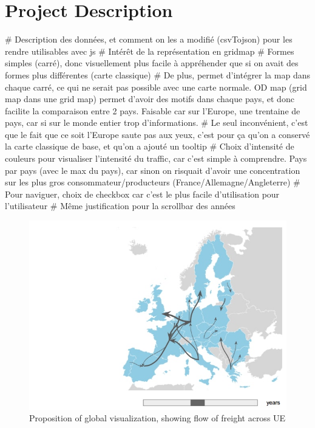 \documentclass{vgtc}
\begin{document}
\section{Project Description}
# Description des données, et comment on les a modifié (csvTojson) pour les rendre utilisables avec js 
# Intérêt de la représentation en gridmap
# Formes simples (carré), donc visuellement plus facile à appréhender que si on avait des formes plus différentes (carte classique)
# De plus, permet d'intégrer la map dans chaque carré, ce qui ne serait pas possible avec une carte normale. OD map (grid map dans une grid map) permet d'avoir des motifs dans chaque pays, et donc facilite la comparaison entre 2 pays. Faisable car sur l'Europe, une trentaine de pays, car si sur le monde entier trop d'informations. 
# Le seul inconvénient, c'est que le fait que ce soit l'Europe saute pas aux yeux, c'est pour ça qu'on a conservé la carte classique de base, et qu'on a ajouté un tooltip  
# Choix d'intensité de couleurs pour visualiser l'intensité du traffic, car c'est simple à comprendre. Pays par pays (avec le max du pays), car sinon on risquait d'avoir une concentration sur les plus gros consommateur/producteurs (France/Allemagne/Angleterre)
# Pour naviguer, choix de checkbox car c'est le plus facile d'utilisation pour l'utilisateur
# Même justification pour la scrollbar des années 

\begin{figure}[H]
\includegraphics[scale=0.35]{Capture_ecran_2017-11-29_171310.jpg}
\caption{Proposition of global visualization, showing flow of freight across UE}
\end{figure}
\end{document}
